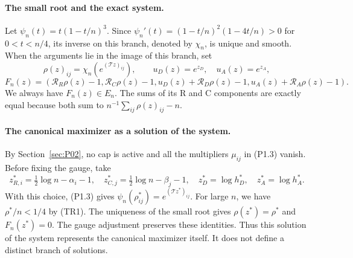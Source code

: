 \paragraph{The small root and the exact system.}
Let $\psi_n(t)=t(1-t/n)^3$. Since
$\psi_n'(t)=(1-t/n)^2(1-4t/n)>0$ for $0<t<n/4$,
its inverse on this branch, denoted by $\chi_n$, is unique and smooth.
When the arguments lie in the image of this branch, set
\[
 \rho(z)_{ij}=\chi_n(e^{(\mathcal Tz)_{ij}}),\qquad
 u_D(z)=e^{z_D},\quad u_A(z)=e^{z_A},
\]
\[
 F_n(z)=(\mathcal R_R\rho(z)-1,\mathcal R_C\rho(z)-1,
 u_D(z)+\mathcal R_D\rho(z)-1,u_A(z)+\mathcal R_A\rho(z)-1).
                                                        \tag{TR5}
\]
We always have $F_n(z)\in E_n$. The sums of its R and C components
are exactly equal because both sum to $n^{-1}\sum_{ij}\rho(z)_{ij}-n$.

\paragraph{The canonical maximizer as a solution of the system.}
By Section~\ref{sec:P02}, no cap is active and all the multipliers $\mu_{ij}$ in (P1.3) vanish.
Before fixing the gauge, take
\[
 z^*_{R,i}=\tfrac12\log n-\alpha_i-1,\quad
 z^*_{C,j}=\tfrac12\log n-\beta_j-1,\quad
 z_D^*=\log h_D^*,\quad z_A^*=\log h_A^*.
\]
With this choice, (P1.3) gives $\psi_n(\rho^*_{ij})=e^{(\mathcal Tz^*)_{ij}}$.
For large $n$, we have $\rho^*/n<1/4$ by (TR1). The uniqueness of the small
root gives $\rho(z^*)=\rho^*$ and $F_n(z^*)=0$.
The gauge adjustment preserves these identities.
Thus this solution of the system represents the canonical maximizer itself. It does not
define a distinct branch of solutions.

